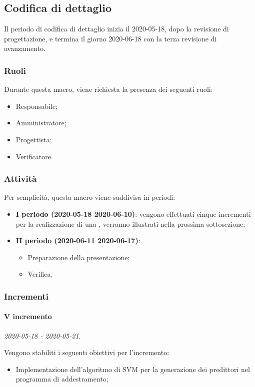 \documentclass[../piano-di-progetto.tex]{subfiles}
\begin{document}
\subsection{Codifica di dettaglio}
Il periodo di codifica di dettaglio inizia il 2020-05-18, dopo la revisione di progettazione, e termina il giorno 2020-06-18 con la terza revisione di avanzamento.
\subsubsection{Ruoli}
Durante questa macro, viene richiesta la presenza dei seguenti ruoli:
\begin{itemize}
    \item Responsabile;
    \item Amministratore;
    \item Progettista;
    \item Verificatore.
\end{itemize}

\subsubsection{Attività}
Per semplicità, questa macro viene suddivisa in periodi:

\begin{itemize}
    \item \textbf{I periodo (2020-05-18 2020-06-10)}: vengono effettuati cinque incrementi per la realizzazione di una , verranno illustrati nella prossima sottosezione;
    \item \textbf{II periodo (2020-06-11 2020-06-17)}:
        \begin{itemize}
            \item Preparazione della presentazione;
            \item Verifica.
        \end{itemize}
\end{itemize}
\subsubsection{Incrementi}

\paragraph{V incremento}
\emph{2020-05-18 - 2020-05-21}. 
 
 Vengono stabiliti i seguenti obiettivi per l'incremento:
 \begin{itemize}
     \item Implementazione dell'algoritmo di SVM per la generazione dei predittori nel programma di addestramento;
 \end{itemize}
\end{document}
